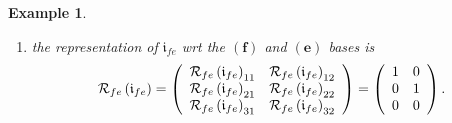 \documentclass[aps,preprint]{revtex4}%
\newtheorem{example}[theorem]{Example}
\begin{document}
\begin{example}
\begin{enumerate}
\begin{enumerate}
\begin{align}
\begin{array}
_{fe}\left(  \mathfrak{i}_{fe}\right)  _{22}\\
\mathcal{R}_{fe}\left(  \mathfrak{i}_{fe}\right)  _{31} & \mathcal{R}%
_{fe}\left(  \mathfrak{i}_{fe}\right)  _{32}%
\end{array}
\right)  \left(
\begin{array}
[c]{c}%
e_{1}^{d}\\
e_{2}^{d}%
\end{array}
\right) \\
&  =\left(
\begin{array}
[c]{ccc}%
f_{1} & f_{2} & f_{3}%
\end{array}
\right)  \left(
\begin{array}
[c]{cc}%
1 & 0\\
0 & 1\\
0 & 0
\end{array}
\right)  \left(
\begin{array}
[c]{c}%
e_{1}^{d}\\
e_{2}^{d}%
\end{array}
\right)  =\left[  f_{1}e_{1}^{d}\right]  +\left[  f_{2}e_{2}^{d}\right]  ,
\end{align}
where

\item the representation of $\mathfrak{i}_{fe}$ wrt the $\left(
\mathbf{f}\right)  $ and $\left(  \mathbf{e}\right)  $ bases is
\begin{equation}
\mathcal{R}_{fe}\left(  \mathfrak{i}_{fe}\right)  =\left(
\begin{array}
[c]{cc}%
\mathcal{R}_{fe}\left(  \mathfrak{i}_{fe}\right)  _{11} & \mathcal{R}%
_{fe}\left(  \mathfrak{i}_{fe}\right)  _{12}\\
\mathcal{R}_{fe}\left(  \mathfrak{i}_{fe}\right)  _{21} & \mathcal{R}%
_{fe}\left(  \mathfrak{i}_{fe}\right)  _{22}\\
\mathcal{R}_{fe}\left(  \mathfrak{i}_{fe}\right)  _{31} & \mathcal{R}%
_{fe}\left(  \mathfrak{i}_{fe}\right)  _{32}%
\end{array}
\right)  =\left(
\begin{array}
[c]{cc}%
1 & 0\\
0 & 1\\
0 & 0
\end{array}
\right)  .
\end{equation}



\end{enumerate}
\end{enumerate}
\end{example}
\end{document}
